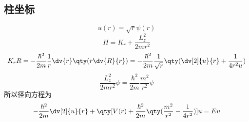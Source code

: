 \subsection{柱坐标}
\begin{equation}
u(r) = \sqrt r \psi (r)
\end{equation}
\begin{equation}
 H = K_r + \frac{L_z^2}{2m r^2}
\end{equation}
\begin{equation}
K_r R = -\frac{\hbar^2}{2m} \frac1r \dv{r} \qty(r \dv{R}{r}) =  - \frac{\hbar^2}{2m} \frac{1}{\sqrt r} \qty(\dv[2]{u}{r} + \frac{1}{4 r^2u})
\end{equation}
\begin{equation}
\frac{L_z^2}{2m r^2}\psi  = \frac{\hbar^2}{2m} \frac{m^2}{r^2}\psi 
\end{equation}
所以径向方程为
\begin{equation}
- \frac{\hbar^2}{2m} \dv[2]{u}{r} + \qty[V(r) + \frac{\hbar^2}{2m} \qty(\frac{m^2}{r^2} - \frac{1}{4 r^2})]u = Eu
\end{equation}

